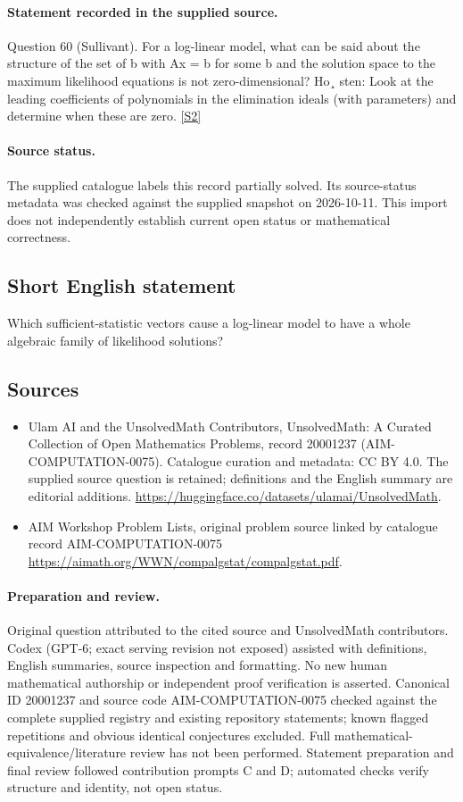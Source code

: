 \documentclass[11pt]{article}
\begin{document}
\paragraph{Statement recorded in the supplied source.}
Question 60 (Sullivant). For a log-linear model, what can be said about the structure of the set of b with Ax = b for some b and the solution space to the maximum likelihood equations is not zero-dimensional? Ho¸ sten: Look at the leading coefficients of polynomials in the elimination ideals (with parameters) and determine when these are zero. \href{https://aimath.org/WWN/compalgstat/compalgstat.pdf}{[S2]}
\paragraph{Source status.}
The supplied catalogue labels this record partially solved. Its source-status metadata was checked against the supplied snapshot on 2026-10-11. This import does not independently establish current open status or mathematical correctness.
\subsection{Short English statement}
Which sufficient-statistic vectors cause a log-linear model to have a whole algebraic family of likelihood solutions?
\subsection{Sources}
\begin{itemize}
\item[S1] Ulam AI and the UnsolvedMath Contributors, UnsolvedMath: A Curated Collection of Open Mathematics Problems, record 20001237 (AIM-COMPUTATION-0075). Catalogue curation and metadata: CC BY 4.0. The supplied source question is retained; definitions and the English summary are editorial additions.
\url{https://huggingface.co/datasets/ulamai/UnsolvedMath}.
\item[S2] AIM Workshop Problem Lists, original problem source linked by catalogue record AIM-COMPUTATION-0075
\url{https://aimath.org/WWN/compalgstat/compalgstat.pdf}.
\end{itemize}
\paragraph{Preparation and review.}
Original question attributed to the cited source and UnsolvedMath contributors. Codex (GPT-6; exact serving revision not exposed) assisted with definitions, English summaries, source inspection and formatting. No new human mathematical authorship or independent proof verification is asserted. Canonical ID 20001237 and source code AIM-COMPUTATION-0075 checked against the complete supplied registry and existing repository statements; known flagged repetitions and obvious identical conjectures excluded. Full mathematical-equivalence/literature review has not been performed. Statement preparation and final review followed contribution prompts C and D; automated checks verify structure and identity, not open status.
\label{end:20001237}
\end{document}
